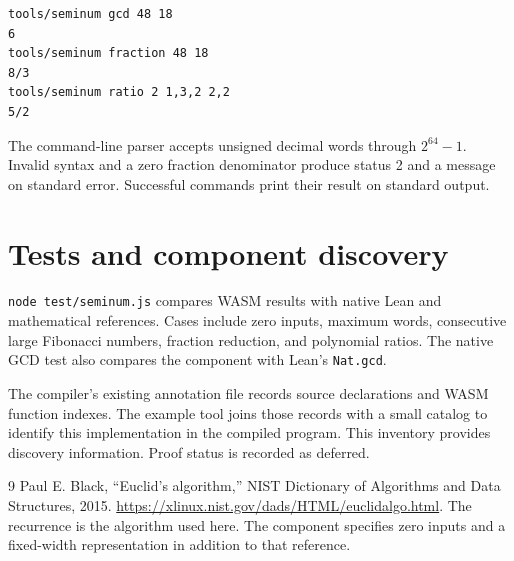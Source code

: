 \begin{lstlisting}
tools/seminum gcd 48 18
6
tools/seminum fraction 48 18
8/3
tools/seminum ratio 2 1,3,2 2,2
5/2
\end{lstlisting}

The command-line parser accepts unsigned decimal words through $2^{64}-1$.
Invalid syntax and a zero fraction denominator produce status 2 and a message
on standard error.  Successful commands print their result on standard output.

\section{Tests and component discovery}
\texttt{node test/seminum.js} compares WASM results with native Lean and
mathematical references.  Cases include zero inputs, maximum words, consecutive
large Fibonacci numbers, fraction reduction, and polynomial ratios.  The native
GCD test also compares the component with Lean's \texttt{Nat.gcd}.

The compiler's existing annotation file records source declarations and WASM
function indexes.  The example tool joins those records with a small catalog
to identify this implementation in the compiled program.  This inventory
provides discovery information.  Proof status is recorded as deferred.

\begin{thebibliography}{9}
 Paul E. Black, ``Euclid's algorithm,'' NIST Dictionary of
Algorithms and Data Structures, 2015.
\url{https://xlinux.nist.gov/dads/HTML/euclidalgo.html}.
The recurrence is the algorithm used here.  The component specifies zero inputs
and a fixed-width representation in addition to that reference.
\end{thebibliography}

